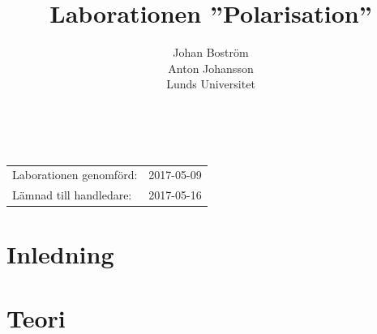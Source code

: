 \documentclass[a4paper]{article}
\title{Laborationen ”Polarisation”}
\author{Johan Boström\\Anton Johansson\\Lunds Universitet}
\makeatletter
\renewcommand*\maketitle{
  {
    \begin{center}
      {\huge\bfseries \@title}\\
      \vspace{5mm}
      {\large \@author}
    \end{center}
    \vspace{2mm}
  }
}
\makeatother
\begin{document}
\maketitle

\renewcommand{\abstractname}{Abstract} %

  

\vspace{2mm}

\hspace{-3mm}
\begin{tabular}{ll}
Laborationen genomförd: &	2017-05-09 \\
Lämnad till handledare: &	2017-05-16 \\
\end{tabular}

\vspace{3mm}

\section{Inledning}

%

\section{Teori}
\end{document}
